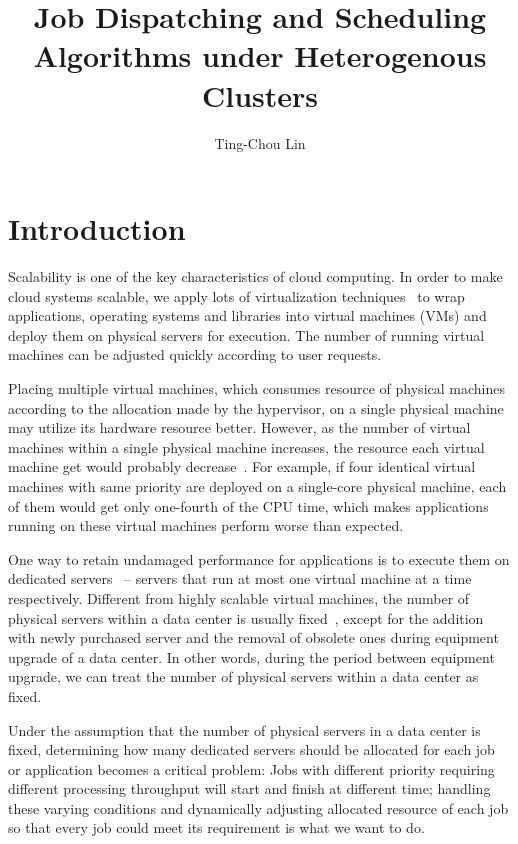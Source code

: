 \documentclass[11pt]{article}
\title{\textbf{Job Dispatching and Scheduling Algorithms under Heterogenous Clusters}}
\author{Ting-Chou Lin\\}
\date{}
\begin{document}
\maketitle

\section{Introduction}

Scalability is one of the key characteristics of cloud computing.  In
order to make cloud systems scalable, we apply lots of virtualization
techniques~\cite{secure_virt_for_cloud, cloud_issue} to wrap
applications, operating systems and libraries into virtual machines
(VMs) and deploy them on physical servers for execution.  The number of
running virtual machines can be adjusted quickly according to user
requests.

Placing multiple virtual machines, which consumes resource of physical
machines according to the allocation made by the hypervisor, on a single
physical machine may utilize its hardware resource better.  However, as
the number of virtual machines within a single physical machine
increases, the resource each virtual machine get would probably
decrease~\cite{resource_overbooking}.  For example, if four identical
virtual machines with same priority are deployed on a single-core
physical machine, each of them would get only one-fourth of the CPU
time, which makes applications running on these virtual machines perform
worse than expected.

One way to retain undamaged performance for applications is to execute
them on dedicated servers~\cite{dedicated_hosting} -- servers that run
at most one virtual machine at a time respectively.  Different from
highly scalable virtual machines, the number of physical servers within
a data center is usually fixed~\cite{maintenance_framework}, except for
the addition with newly purchased server and the removal of obsolete
ones during equipment upgrade of a data center.  In other words, during
the period between equipment upgrade, we can treat the number of
physical servers within a data center as fixed.

Under the assumption that the number of physical servers in a data
center is fixed, determining how many dedicated servers should be
allocated for each job or application becomes a critical problem:  Jobs
with different priority requiring different processing throughput will
start and finish at different time; handling these varying conditions
and dynamically adjusting allocated resource of each job so that every
job could meet its requirement is what we want to do.
\end{document}
